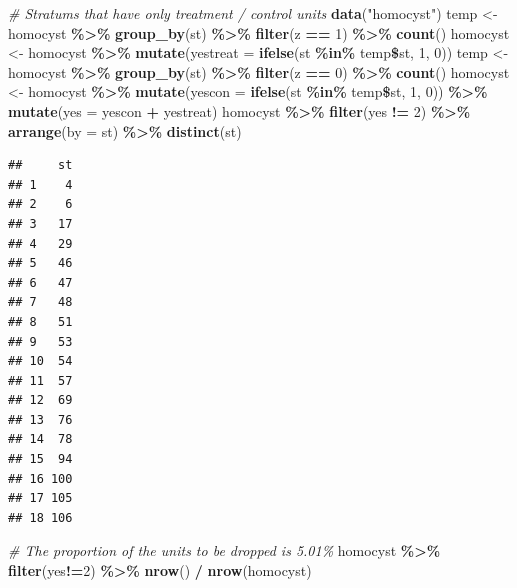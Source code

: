 \documentclass[]{article}
\newenvironment{Shaded}{\begin{snugshade}}{\end{snugshade}}
\newcommand{\KeywordTok}[1]{\textcolor[rgb]{0.13,0.29,0.53}{\textbf{#1}}}
\newcommand{\DataTypeTok}[1]{\textcolor[rgb]{0.13,0.29,0.53}{#1}}
\newcommand{\DecValTok}[1]{\textcolor[rgb]{0.00,0.00,0.81}{#1}}
\newcommand{\StringTok}[1]{\textcolor[rgb]{0.31,0.60,0.02}{#1}}
\newcommand{\CommentTok}[1]{\textcolor[rgb]{0.56,0.35,0.01}{\textit{#1}}}
\newcommand{\OperatorTok}[1]{\textcolor[rgb]{0.81,0.36,0.00}{\textbf{#1}}}
\newcommand{\NormalTok}[1]{#1}
\begin{document}
\begin{Shaded}
\begin{Highlighting}[]
\CommentTok{# Stratums that have only treatment / control units}
\KeywordTok{data}\NormalTok{(}\StringTok{"homocyst"}\NormalTok{)}
\NormalTok{temp <-}\StringTok{ }\NormalTok{homocyst }\OperatorTok{\%>\%}
\StringTok{  }\KeywordTok{group_by}\NormalTok{(st) }\OperatorTok{\%>\%}
\StringTok{  }\KeywordTok{filter}\NormalTok{(z }\OperatorTok{==}\StringTok{ }\DecValTok{1}\NormalTok{) }\OperatorTok{\%>\%}\StringTok{ }\KeywordTok{count}\NormalTok{()}
\NormalTok{homocyst <-}\StringTok{ }\NormalTok{homocyst }\OperatorTok{\%>\%}
\StringTok{  }\KeywordTok{mutate}\NormalTok{(}\DataTypeTok{yestreat =} \KeywordTok{ifelse}\NormalTok{(st }\OperatorTok{\%in\%}\StringTok{ }\NormalTok{temp}\OperatorTok{\$}\NormalTok{st, }\DecValTok{1}\NormalTok{, }\DecValTok{0}\NormalTok{))}
\NormalTok{temp <-}\StringTok{ }\NormalTok{homocyst }\OperatorTok{\%>\%}
\StringTok{  }\KeywordTok{group_by}\NormalTok{(st) }\OperatorTok{\%>\%}
\StringTok{  }\KeywordTok{filter}\NormalTok{(z }\OperatorTok{==}\StringTok{ }\DecValTok{0}\NormalTok{) }\OperatorTok{\%>\%}\StringTok{ }\KeywordTok{count}\NormalTok{()}
\NormalTok{homocyst <-}\StringTok{ }\NormalTok{homocyst }\OperatorTok{\%>\%}
\StringTok{  }\KeywordTok{mutate}\NormalTok{(}\DataTypeTok{yescon =} \KeywordTok{ifelse}\NormalTok{(st }\OperatorTok{\%in\%}\StringTok{ }\NormalTok{temp}\OperatorTok{\$}\NormalTok{st, }\DecValTok{1}\NormalTok{, }\DecValTok{0}\NormalTok{)) }\OperatorTok{\%>\%}
\StringTok{  }\KeywordTok{mutate}\NormalTok{(}\DataTypeTok{yes =}\NormalTok{ yescon }\OperatorTok{+}\StringTok{ }\NormalTok{yestreat)}
\NormalTok{homocyst }\OperatorTok{\%>\%}
\StringTok{  }\KeywordTok{filter}\NormalTok{(yes }\OperatorTok{!=}\StringTok{ }\DecValTok{2}\NormalTok{) }\OperatorTok{\%>\%}
\StringTok{  }\KeywordTok{arrange}\NormalTok{(}\DataTypeTok{by =}\NormalTok{ st) }\OperatorTok{\%>\%}
\StringTok{  }\KeywordTok{distinct}\NormalTok{(st)}
\end{Highlighting}
\end{Shaded}

\begin{verbatim}
##     st
## 1    4
## 2    6
## 3   17
## 4   29
## 5   46
## 6   47
## 7   48
## 8   51
## 9   53
## 10  54
## 11  57
## 12  69
## 13  76
## 14  78
## 15  94
## 16 100
## 17 105
## 18 106
\end{verbatim}

\begin{Shaded}
\begin{Highlighting}[]
\CommentTok{# The proportion of the units to be dropped is 5.01\%}
\NormalTok{homocyst }\OperatorTok{\%>\%}
\StringTok{  }\KeywordTok{filter}\NormalTok{(yes}\OperatorTok{!=}\DecValTok{2}\NormalTok{) }\OperatorTok{\%>\%}
\StringTok{  }\KeywordTok{nrow}\NormalTok{() }\OperatorTok{/}\StringTok{ }\KeywordTok{nrow}\NormalTok{(homocyst)}
\end{Highlighting}
\end{Shaded}
\end{document}
